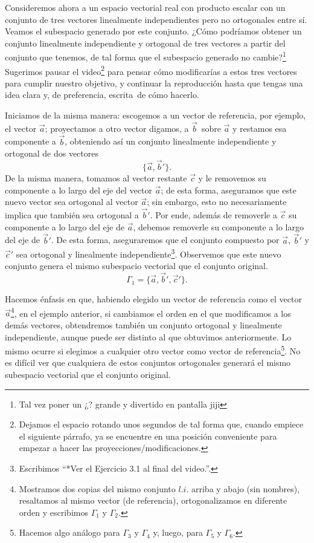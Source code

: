 \documentclass[12pt,dvipsnames]{article}
\numberwithin{equation}{section}
\begin{document}
Consideremos ahora a un espacio vectorial real con producto escalar con un conjunto de tres vectores linealmente independientes pero no ortogonales entre sí. Veamos el subespacio generado por este conjunto. ¿Cómo podríamos obtener un conjunto linealmente independiente y ortogonal de tres vectores a partir del conjunto que tenemos, de tal forma que el subespacio generado no cambie?\footnote{Tal vez poner un ¿? grande y divertido en pantalla jiji} Sugerimos pausar el video\footnote{Dejamos el espacio rotando unos segundos de tal forma que, cuando empiece el siguiente párrafo, ya se encuentre en una posición conveniente para empezar a hacer las proyecciones/modificaciones.} para pensar cómo modificarías a estos tres vectores para cumplir nuestro objetivo, y continuar la reproducción hasta que tengas una idea clara \textemdash y, de preferencia, escrita\textemdash \ de cómo hacerlo.

Iniciamos de la misma manera: escogemos a un vector de referencia, por ejemplo, el vector $\vec{a}$; proyectamos a otro vector \textemdash digamos, a $\vec{b}$\textemdash \ sobre $\vec{a}$ y restamos esa componente a $\vec{b}$, obteniendo así un conjunto linealmente independiente y ortogonal de dos vectores\[
\{\vec{a},\vec{b}'\}.
\] De la misma manera, tomamos al vector restante $\vec{c}$ y le removemos su componente a lo largo del eje del vector $\vec{a}$; de esta forma, aseguramos que este nuevo vector sea ortogonal al vector $\vec{a}$; sin embargo, esto no necesariamente implica que también sea ortogonal a $\vec{b}'$. Por ende, además de removerle a $\vec{c}$ su componente a lo largo del eje de $\vec{a}$, debemos removerle su componente a lo largo del eje de $\vec{b}'$. De esta forma, aseguraremos que el conjunto compuesto por $\vec{a}$, $\vec{b}'$ y $\vec{c}'$ sea ortogonal y linealmente independiente\footnote{Escribimos ``*Ver el Ejercicio 3.1 al final del video.''.}. Observemos que este nuevo conjunto genera el mismo subespacio vectorial que el conjunto original.
\[
\Gamma_1 = \{\vec{a},\vec{b}',\vec{c}'\}.
\]

Hacemos énfasis en que, habiendo elegido un vector de referencia \textemdash como el vector $\vec{a}$\footnote{Mostramos dos copias del mismo conjunto $l.i.$ arriba y abajo (sin nombres), resaltamos al mismo vector (de referencia), ortogonalizamos en diferente orden y escribimos $\Gamma_1$ y $\Gamma_2$.}, en el ejemplo anterior\textemdash, si cambiamos el orden en el que modificamos a los demás vectores, obtendremos también un conjunto ortogonal y linealmente independiente, aunque puede ser distinto al que obtuvimos anteriormente. Lo mismo ocurre si elegimos a cualquier otro vector como vector de referencia\footnote{Hacemos algo análogo para $\Gamma_3$ y $\Gamma_4$ y, luego, para $\Gamma_5$ y $\Gamma_6$.}. No es difícil ver que cualquiera de estos conjuntos ortogonales generará el mismo subespacio vectorial que el conjunto original.
\end{document}
